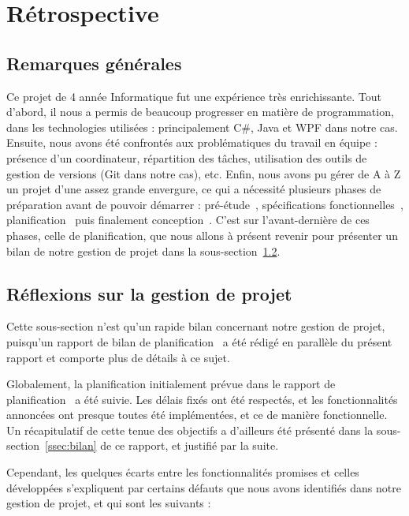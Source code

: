 \section{Rétrospective}
\label{sec:retro}

\subsection{Remarques générales}
\label{ssec:rq_gen}

Ce projet de 4\ieme{} année Informatique fut une expérience très enrichissante. Tout d'abord, il nous a permis de beaucoup progresser en matière de programmation, dans les technologies utilisées : principalement C\#, Java et WPF dans notre cas. Ensuite, nous avons été confrontés aux problématiques du travail en équipe : présence d'un coordinateur, répartition des tâches, utilisation des outils de gestion de versions (Git dans notre cas), etc. Enfin, nous avons pu gérer de A à Z un projet d'une assez grande envergure, ce qui a nécessité plusieurs phases de préparation avant de pouvoir démarrer : pré-étude~\cite{pre_etude}, spécifications fonctionnelles~\cite{spec_fonc}, planification~\cite{planif} puis finalement conception~\cite{conception}. C'est sur l'avant-dernière de ces phases, celle de planification, que nous allons à présent revenir pour présenter un bilan de notre gestion de projet dans la {\sc sous-section}~\ref{ssec:gestionProjet}.

\subsection{Réflexions sur la gestion de projet}
\label{ssec:gestionProjet}

Cette sous-section n'est qu'un rapide bilan concernant notre gestion de projet, puisqu'un rapport de bilan de planification~\cite{bilanPlanif} a été rédigé en parallèle du présent rapport et comporte plus de détails à ce sujet.

Globalement, la planification initialement prévue dans le rapport de planification~\cite{planif} a été suivie. Les délais fixés ont été respectés, et les fonctionnalités annoncées ont presque toutes été implémentées, et ce de manière fonctionnelle. Un récapitulatif de cette tenue des objectifs a d'ailleurs été présenté dans la {\sc sous-section}~\ref{ssec:bilan} de ce rapport, et justifié par la suite. 

Cependant, les quelques écarts entre les fonctionnalités promises et celles développées s'expliquent par certains défauts que nous avons identifiés dans notre gestion de projet, et qui sont les suivants : 

